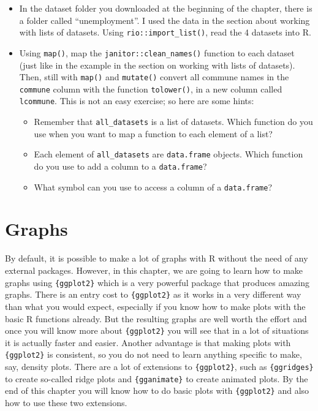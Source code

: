 \documentclass[
]{article}
\providecommand{\tightlist}{%
  \setlength{\itemsep}{0pt}\setlength{\parskip}{0pt}}
\begin{document}
\begin{itemize}
\item
  In the dataset folder you downloaded at the beginning of the chapter, there is a folder called
  ``unemployment''. I used the data in the section about working with lists of datasets. Using
  \texttt{rio::import\_list()}, read the 4 datasets into R.
\item
  Using \texttt{map()}, map the \texttt{janitor::clean\_names()} function to each dataset (just like in the example
  in the section on working with lists of datasets). Then, still with \texttt{map()} and \texttt{mutate()} convert
  all commune names in the \texttt{commune} column with the function \texttt{tolower()}, in a new column called \texttt{lcommune}.
  This is not an easy exercise; so here are some hints:

  \begin{itemize}
  \tightlist
  \item
    Remember that \texttt{all\_datasets} is a list of datasets. Which function do you use when you want to map a function to each element of a list?
  \item
    Each element of \texttt{all\_datasets} are \texttt{data.frame} objects. Which function do you use to add a column to a \texttt{data.frame}?
  \item
    What symbol can you use to access a column of a \texttt{data.frame}?
  \end{itemize}
\end{itemize}

\hypertarget{graphs}{%
\section{Graphs}\label{graphs}}

By default, it is possible to make a lot of graphs with R without the need of any external
packages. However, in this chapter, we are going to learn how to make graphs using \texttt{\{ggplot2\}} which
is a very powerful package that produces amazing graphs. There is an entry cost to \texttt{\{ggplot2\}} as it
works in a very different way than what you would expect, especially if you know how to make plots
with the basic R functions already. But the resulting graphs are well worth the effort and once
you will know more about \texttt{\{ggplot2\}} you will see that in a lot of situations it is actually faster
and easier. Another advantage is that making plots with \texttt{\{ggplot2\}} is consistent, so you do not need
to learn anything specific to make, say, density plots. There are a lot of extensions to \texttt{\{ggplot2\}},
such as \texttt{\{ggridges\}} to create so-called ridge plots and \texttt{\{gganimate\}} to create animated plots. By
the end of this chapter you will know how to do basic plots with \texttt{\{ggplot2\}} and also how to use these
two extensions.
\end{document}
